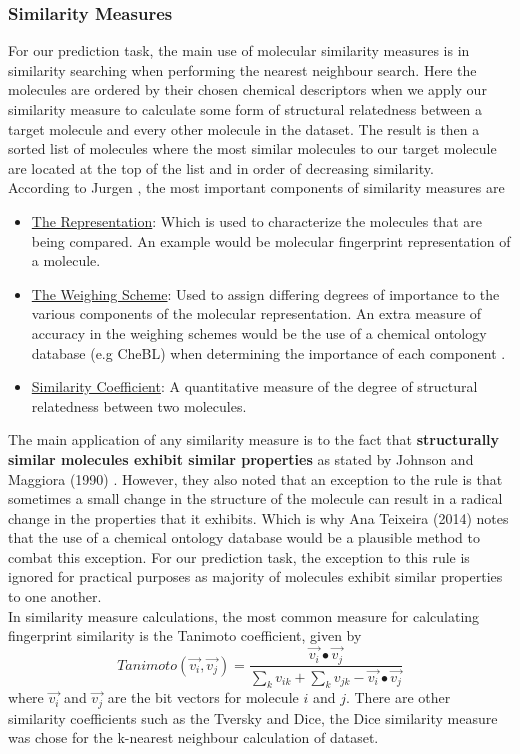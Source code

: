 \documentclass[a4paper,12pt]{report}
\begin{document}
		\subsubsection{Similarity Measures} 
		\label{subsubsection_similarity_measures}
		For our prediction task, the main use of molecular similarity measures is in similarity searching when performing the nearest neighbour search. Here the molecules are ordered by their chosen chemical descriptors when we apply our similarity measure to calculate some form of structural relatedness between a target molecule and every other molecule in the dataset. The result is then a sorted list of molecules where the most similar molecules to our target molecule are located at the top of the list and in order of decreasing similarity.\\
		According to Jurgen \cite{Jurgen2004}, the most important components of similarity measures are
		\begin{itemize}
			\item \underline{The Representation}: Which is used to characterize the molecules that are being compared. An example would be molecular fingerprint representation of a molecule.
			\item \underline{The Weighing Scheme}: Used to assign differing degrees of importance to the various components of the molecular representation. An extra measure of accuracy in the weighing schemes would be the use of a chemical ontology database (e.g CheBL) when determining the importance of each component \cite{AnaPhd2014}.
			\item \underline{Similarity Coefficient}: A quantitative measure of the degree of structural relatedness between two molecules.
		\end{itemize}
		The main application of any similarity measure is to the fact that \textbf{structurally similar molecules exhibit similar properties} as stated by Johnson and Maggiora (1990) \cite{JohnMaggiora1990}. However, they also noted that an exception to the rule is that sometimes a small change in the structure of the molecule can result in a radical change in the properties that it exhibits. Which is why Ana Teixeira (2014) \cite{AnaPhd2014} notes that the use of a chemical ontology database would be a plausible method to combat this exception. For our prediction task, the exception to this rule is ignored for practical purposes as majority of molecules exhibit similar properties to one another.\\
		In similarity measure calculations, the most common measure for calculating fingerprint similarity is the Tanimoto coefficient, given by 
		\begin{equation}
		Tanimoto(\vec{v_i}, \vec{v_j}) = 
		\frac{\vec{v_i}\bullet\vec{v_j}}
		{\sum_{k}v_{ik} + \sum_{k}v_{jk} - \vec{v_i}\bullet\vec{v_j}  } 
		\end{equation}
		where $\vec{v_i}$ and $\vec{v_j}$ are the bit vectors for molecule $i$ and $j$. There are other similarity coefficients such as the Tversky and Dice, the Dice similarity measure was chose for the k-nearest neighbour calculation of dataset.
	
\end{document}
